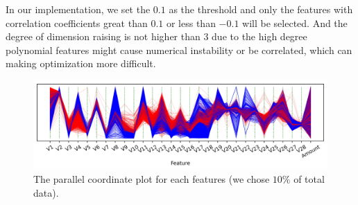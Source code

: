 \documentclass[11pt]{article}
\begin{document}
In our implementation, we set the $0.1$ as the threshold and only the features with correlation coefficients great than $0.1$ or less than $-0.1$ will be selected. And the degree of dimension raising is not higher than $3$ due to the high degree polynomial features might cause numerical instability or be correlated, which can making optimization more difficult.

\begin{figure}[H]
  \centering
  \includegraphics[width=\textwidth]{../code/Task3/Analysis/PC.jpg}
  \caption{The parallel coordinate plot for each features (we chose $10\%$ of total data).}
  \label{task-3-data-distribution}
\end{figure}
\end{document}
